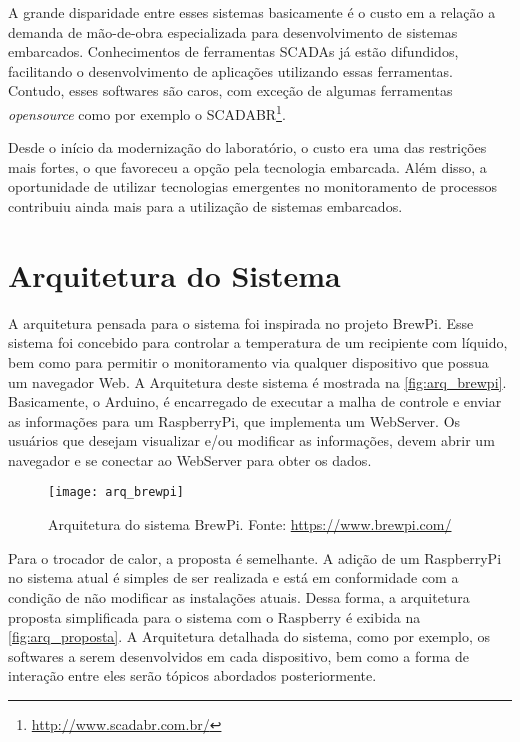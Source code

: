 		A grande disparidade entre esses sistemas basicamente é o custo em a relação a demanda de mão-de-obra especializada para desenvolvimento de sistemas embarcados. Conhecimentos de ferramentas SCADAs já estão difundidos, facilitando o desenvolvimento de aplicações utilizando essas ferramentas. Contudo, esses softwares são caros, com exceção de algumas ferramentas \textit{opensource} como por exemplo o SCADABR\footnote{\url{http://www.scadabr.com.br/}}.
		
		Desde o início da modernização do laboratório, o custo era uma das restrições mais fortes, o que favoreceu a opção pela tecnologia embarcada. Além disso, a oportunidade de utilizar tecnologias emergentes no monitoramento de processos contribuiu ainda mais para a utilização de sistemas embarcados.
		
	\section{Arquitetura do Sistema}
		A arquitetura pensada para o sistema foi inspirada no projeto BrewPi. Esse sistema foi concebido para controlar a temperatura de um recipiente com líquido, bem como para permitir o monitoramento via qualquer dispositivo que possua um navegador Web. A Arquitetura deste sistema é mostrada na \autoref{fig:arq_brewpi}. Basicamente, o Arduino, é encarregado de executar a malha de controle e enviar as informações para um RaspberryPi, que implementa um WebServer. Os usuários que desejam visualizar e/ou modificar as informações, devem abrir um navegador e se conectar ao WebServer para obter os dados.
		
		\begin{figure}[!htb]	
			\captionsetup{justification=centering}
			\begin{center}
				\texttt{[image: arq\_brewpi]}  %
				\caption[Arquitetura do sistema BrewPi]{\label{fig:arq_brewpi}Arquitetura do sistema BrewPi. Fonte: \url{https://www.brewpi.com/} }
			\end{center}		
		\end{figure}
	
		Para o trocador de calor, a proposta é semelhante. A adição de um RaspberryPi no sistema atual é simples de ser realizada e está em conformidade com a condição de não modificar as instalações atuais. Dessa forma, a arquitetura proposta simplificada para o sistema com o Raspberry é exibida na \autoref{fig:arq_proposta}. A Arquitetura detalhada do sistema, como por exemplo, os softwares a serem desenvolvidos em cada dispositivo, bem como a forma de interação entre eles serão tópicos abordados posteriormente.
		
